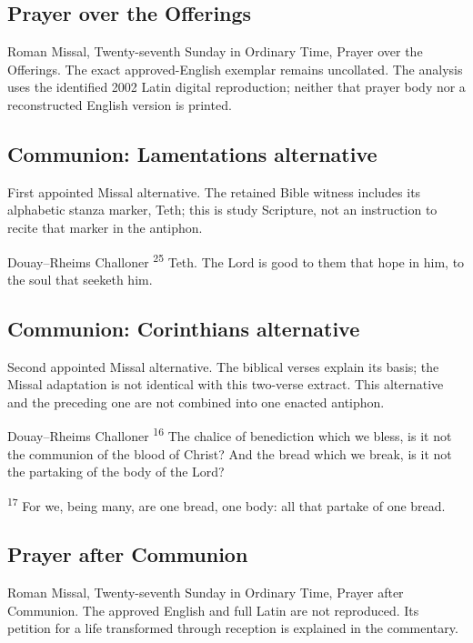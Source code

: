 \subsection{Prayer over the Offerings}
\label{proper-offerings}
Roman Missal, Twenty-seventh Sunday in Ordinary Time, Prayer over the Offerings. The exact approved-English exemplar remains uncollated. The analysis uses the identified 2002 Latin digital reproduction; neither that prayer body nor a reconstructed English version is printed.

\subsection{Communion: Lamentations alternative}
\label{proper-communion-lamentations}
First appointed Missal alternative. The retained Bible witness includes its alphabetic stanza marker, Teth; this is study Scripture, not an instruction to recite that marker in the antiphon.
\begin{englishwitness}{Douay--Rheims Challoner}
\textsuperscript{25} Teth. The Lord is good to them that hope in him, to the soul that seeketh him.
\end{englishwitness}

\subsection{Communion: Corinthians alternative}
\label{proper-communion-corinthians}
Second appointed Missal alternative. The biblical verses explain its basis; the Missal adaptation is not identical with this two-verse extract. This alternative and the preceding one are not combined into one enacted antiphon.
\begin{englishwitness}{Douay--Rheims Challoner}
\textsuperscript{16} The chalice of benediction which we bless, is it not the communion of the blood of Christ? And the bread which we break, is it not the partaking of the body of the Lord?

\textsuperscript{17} For we, being many, are one bread, one body: all that partake of one bread.
\end{englishwitness}

\subsection{Prayer after Communion}
\label{proper-after-communion}
Roman Missal, Twenty-seventh Sunday in Ordinary Time, Prayer after Communion. The approved English and full Latin are not reproduced. Its petition for a life transformed through reception is explained in the commentary.
